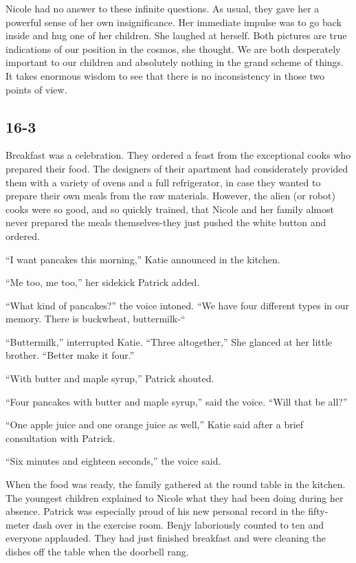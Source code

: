 \documentclass[]{article}
\begin{document}
{Nicole had no answer to these infinite questions.  As usual, they gave her a powerful sense of her own insignificance.  Her immediate impulse was to go back inside and hug one of her children.  She laughed at herself.  Both pictures are true indications of our position in the cosmos, she thought.  We are both desperately important to our children and absolutely nothing in the grand scheme of things.  It takes enormous wisdom to see that there is no inconsistency in those two points of view.

\subsection*{16-3}

Breakfast was a celebration.  They ordered a feast from the exceptional cooks who prepared their food.  The designers of their apartment had considerately provided them with a variety of ovens and a full refrigerator, in case they wanted to prepare their own meals from the raw materials.  However, the alien (or robot) cooks were so good, and so quickly trained, that Nicole and her family almost never prepared the meals themselves-they just pushed the white button and ordered.

“I want pancakes this morning,” Katie announced in the kitchen.

“Me too, me too,” her sidekick Patrick added.

“What kind of pancakes?” the voice intoned.  “We have four different types in our memory.  There is buckwheat, buttermilk-“

“Buttermilk,” interrupted Katie.  “Three altogether,” She glanced at her little brother.  “Better make it four.”

“With butter and maple syrup,” Patrick shouted.

“Four pancakes with butter and maple syrup,” said the voice.  “Will that be all?”

“One apple juice and one orange juice as well,” Katie said after a brief consultation with Patrick.

“Six minutes and eighteen seconds,” the voice said.

When the food was ready, the family gathered at the round table in the kitchen.  The youngest children explained to Nicole what they had been doing during her absence.  Patrick was especially proud of his new personal record in the fifty-meter dash over in the exercise room.  Benjy laboriously counted to ten and everyone applauded.  They had just finished breakfast and were cleaning the dishes off the table when the doorbell rang.

}
\end{document}
